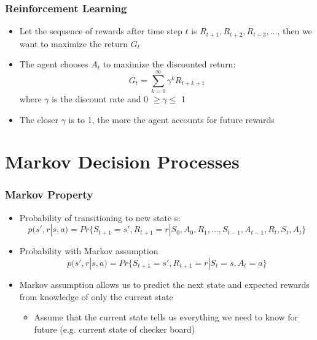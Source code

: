 \documentclass{beamer}
\begin{document}

\begin{frame}
\frametitle{Reinforcement Learning}
\begin{itemize}
\item Let the sequence of rewards after time step $t$ is $R_{t+1}, R_{t+2}, R_{t+3},...$, then we want to maximize the return $G_t$
\item The agent chooses $A_t$ to maximize the discounted return: 
\begin{equation}
G_t = \sum_{k=0}^{\infty} \gamma^k R_{t+k+1}
\nonumber
\end{equation}
where $\gamma$ is the discount rate and 0 $\geq \gamma \leq$ 1
\item The closer $\gamma$ is to 1, the more the agent accounts for future rewards
\end{itemize}
\end{frame}

\section{Markov Decision Processes} %


\begin{frame}
\frametitle{Markov Property}
\begin{itemize}
\item Probability of transitioning to new state s:
\small
\begin{equation}
p(s',r | s,a)=Pr\{S_{t+1}=s', R_{t+1}=r|S_0, A_0, R_1,...,S_{t-1},A_{t-1},R_t, S_t, A_t\}
\nonumber
\end{equation}
\normalsize
\item Probability with Markov assumption
\begin{equation}
p(s',r | s,a) = Pr\{S_{t+1} = s', R_{t+1} = r | S_t = s, A_t = a\}
\nonumber
\end{equation}
\item Markov assumption allows us to predict the next state and expected rewards from knowledge of only the current state
   \begin{itemize}
   	\item Assume that the current state tells us everything we need to know for future (e.g. current state of checker board)
      \end{itemize}
\end{itemize}
\end{frame}
\end{document}
